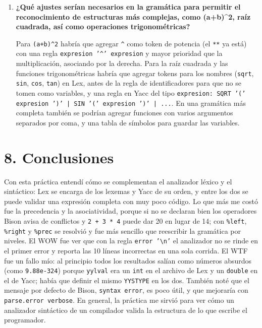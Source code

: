 \documentclass{article}
\begin{document}
\begin{enumerate}
        \item \textbf{¿Qué ajustes serían necesarios en la gramática para permitir el reconocimiento de estructuras más complejas, como (a+b)\^{}2, raíz cuadrada, así como operaciones trigonométricas?}

        Para \texttt{(a+b)\^{}2} habría que agregar \texttt{\^{}} como token de potencia (el \texttt{**} ya está) con una regla \texttt{expresion '\^{}' expresion} y mayor prioridad que la multiplicación, asociando por la derecha. Para la raíz cuadrada y las funciones trigonométricas habría que agregar tokens para los nombres (\texttt{sqrt}, \texttt{sin}, \texttt{cos}, \texttt{tan}) en Lex, antes de la regla de identificadores para que no se tomen como variables, y una regla en Yacc del tipo \texttt{expresion: SQRT '(' expresion ')' | SIN '(' expresion ')' | ...}. En una gramática más completa también se podrían agregar funciones con varios argumentos separados por coma, y una tabla de símbolos para guardar las variables.
    \end{enumerate}
    \newpage

\section{8. Conclusiones}
    Con esta práctica entendí cómo se complementan el analizador léxico y el sintáctico: Lex se encarga de los lexemas y Yacc de su orden, y entre los dos se puede validar una expresión completa con muy poco código. Lo que más me costó fue la precedencia y la asociatividad, porque si no se declaran bien los operadores Bison avisa de conflictos y \texttt{2 + 3 * 4} puede dar 20 en lugar de 14; con \texttt{\%left}, \texttt{\%right} y \texttt{\%prec} se resolvió y fue más sencillo que reescribir la gramática por niveles. El WOW fue ver que con la regla \texttt{error '\textbackslash n'} el analizador no se rinde en el primer error y reporta las 10 líneas incorrectas en una sola corrida. El WTF fue un fallo mío: al principio todos los resultados salían como números absurdos (como \texttt{9.88e-324}) porque \texttt{yylval} era un \texttt{int} en el archivo de Lex y un \texttt{double} en el de Yacc; había que definir el mismo \texttt{YYSTYPE} en los dos. También noté que el mensaje por defecto de Bison, \texttt{syntax error}, es poco útil, y que mejoraría con \texttt{parse.error verbose}. En general, la práctica me sirvió para ver cómo un analizador sintáctico de un compilador valida la estructura de lo que escribe el programador.
\end{document}
